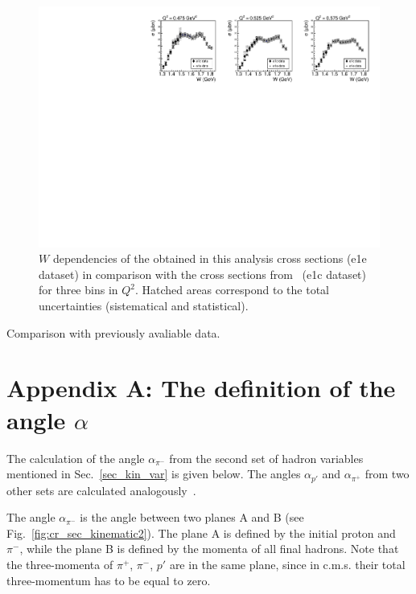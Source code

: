 \documentclass[prc,twocolumn,superscriptaddress,showpacs,amssymb,amsmath,amsfonts,linenumbers,aps]{revtex4-1}
\begin{document}
\begin{figure}[htp]
\begin{center}
\includegraphics[width=12cm]{pictures/conclusions/e1e_e1c.pdf}
\caption{\small $W$ dependencies of the obtained in this analysis  cross sections (e1e dataset) in comparison with the cross sections from~\cite{Fedotov:2008aa} (e1c dataset) for three bins in $Q^{2}$. Hatched areas correspond to the total uncertainties (sistematical and statistical).}
\label{fig:e1e_e1c}
\end{center}
\end{figure}



Comparison with previously avaliable data.

\begin{acknowledgments}


\end{acknowledgments}

\clearpage
\section*{Appendix A: The definition of the angle $\alpha$}
\label{app_a}


The calculation of the angle $\alpha_{\pi^{-}}$ from the second set of hadron variables mentioned in Sec.~\ref{sec_kin_var} is given below. The angles $\alpha_{p'}$ and $\alpha_{\pi^{+}}$ from two other sets are calculated analogously~\cite{Fed_an_note:2017}.

The angle $\alpha_{\pi^{-}}$ is the angle between two planes A and B (see Fig.~\ref{fig:cr_sec_kinematic2}).
The plane A is defined by
the initial proton and $\pi^{-}$, while the plane B is defined by the momenta of
all final hadrons. Note that the three-momenta of $\pi^{+}$,
$\pi^{-}$, $p'$ are in the same plane, since in c.m.s.
their total three-momentum has to be equal to zero.
\end{document}
